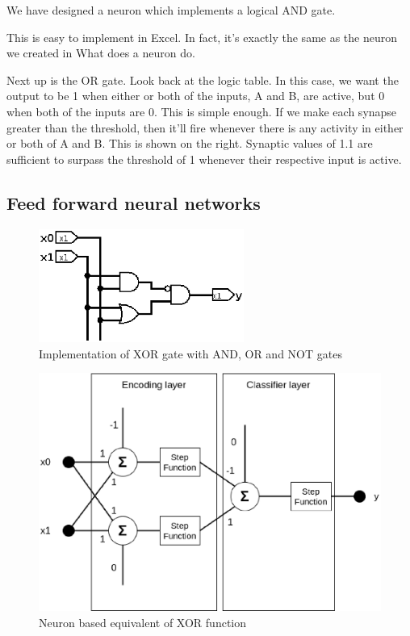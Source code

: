 We have designed a neuron which implements a logical AND gate.  

This is easy to implement in Excel.  In fact, it's exactly the same as the neuron we 
created in What does a neuron do.  

Next up is the OR gate.  Look back at the logic table.  In this case, we want the output to 
be 1 when either or both of the inputs, A and B, are active, but 0 when both of the inputs are 0.  
This is simple enough.  If we make each synapse greater than the threshold, 
then it'll fire whenever there is any activity in either or both of A and B.
This is shown on the right.  Synaptic values of 1.1 are sufficient to surpass 
the threshold of 1 whenever their respective input is active.  
	

\subsection{Feed forward neural networks}
\FloatBarrier

\begin{figure}[htb] 
	\label{fig:xor_gates}
	\centering
	\includegraphics[width=0.6\textwidth]{figures/xor_gates}
	\caption{Implementation of XOR gate with AND, OR and NOT gates}
\end{figure}

\begin{figure}[htb] 
	\label{fig:neuro_xor}
	\centering
	\includegraphics[width=\textwidth]{figures/neuro_xor}
	\caption{Neuron based equivalent of XOR function}
\end{figure}

